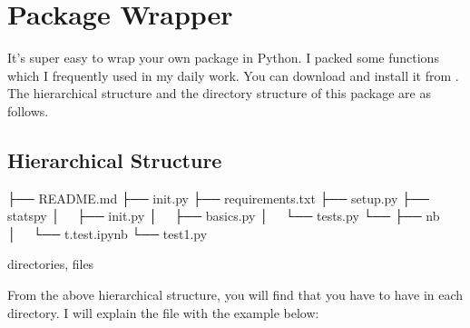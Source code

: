 \documentclass[letterpaper,12pt,english]{sphinxmanual}
\begin{document}
\chapter{Package Wrapper}
\label{\detokenize{pack:package-wrapper}}\label{\detokenize{pack:pack}}\label{\detokenize{pack::doc}}
\sphinxAtStartPar
It’s super easy to wrap your own package in Python. I packed some functions which I frequently
used in my daily work. You can download and install it from . The hierarchical
structure and the directory structure of this package are as follows.


\section{Hierarchical Structure}
\label{\detokenize{pack:hierarchical-structure}}
\begin{sphinxVerbatim}[commandchars=\\\{\}]
├── README.md
├── \PYGZus{}\PYGZus{}init\PYGZus{}\PYGZus{}.py
├── requirements.txt
├── setup.py
├── statspy
│   ├── \PYGZus{}\PYGZus{}init\PYGZus{}\PYGZus{}.py
│   ├── basics.py
│   └── tests.py
└── 
    ├── nb
    │   └── t.test.ipynb
    └── test1.py

 directories,  files
\end{sphinxVerbatim}

\sphinxAtStartPar
From the above hierarchical structure, you will find that you have to have  in each directory. I will explain the  file with the example below:
\end{document}
